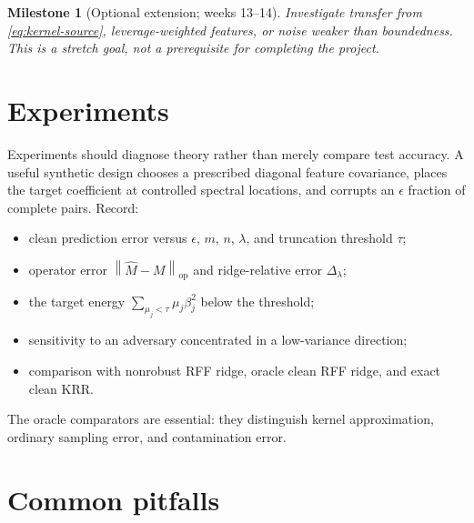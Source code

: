 \documentclass[11pt]{article}
\newtheorem{milestone}[definition]{Milestone}
\newcommand{\op}{\mathrm{op}}
\newcommand{\norm}[1]{\left\lVert #1\right\rVert}
\begin{document}
\begin{milestone}[Optional extension; weeks 13--14]
Investigate transfer from \eqref{eq:kernel-source}, leverage-weighted features,
or noise weaker than boundedness.  This is a stretch goal, not a prerequisite
for completing the project.
\end{milestone}

\section{Experiments}

Experiments should diagnose theory rather than merely compare test accuracy.
A useful synthetic design chooses a prescribed diagonal feature covariance,
places the target coefficient at controlled spectral locations, and corrupts
an $\epsilon$ fraction of complete pairs.  Record:
\begin{itemize}
 \item clean prediction error versus $\epsilon$, $m$, $n$, $\lambda$, and
       truncation threshold $\tau$;
 \item operator error $\norm{\widehat M-M}_\op$ and ridge-relative error
       $\Delta_\lambda$;
 \item the target energy $\sum_{\mu_j<\tau}\mu_j\beta_j^2$ below the threshold;
 \item sensitivity to an adversary concentrated in a low-variance direction;
 \item comparison with nonrobust RFF ridge, oracle clean RFF ridge, and exact
       clean KRR.
\end{itemize}
The oracle comparators are essential: they distinguish kernel approximation,
ordinary sampling error, and contamination error.

\section{Common pitfalls}
\end{document}
